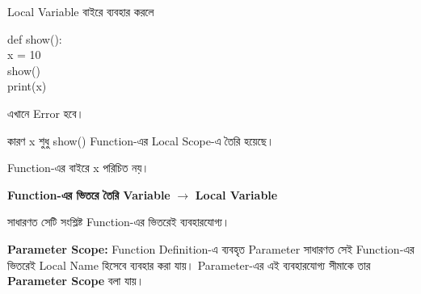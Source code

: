 \begin{codeoutputbox}{Local Variable বাইরে ব্যবহার করলে}

\noindent
\begin{minipage}[t]{0.52\linewidth}
\codeheading

\begin{english}
\ttfamily
def show():\\
\hspace*{4mm}x = 10\\[0.5mm]
show()\\
print(x)
\end{english}

\end{minipage}
\hfill
\begin{minipage}[t]{0.44\linewidth}
\outputheading

এখানে Error হবে।

কারণ
\textenglish{\ttfamily x}
শুধু
\textenglish{\ttfamily show()}
Function-এর Local Scope-এ তৈরি হয়েছে।

Function-এর বাইরে
\textenglish{\ttfamily x}
পরিচিত নয়।

\end{minipage}

\end{codeoutputbox}

\begin{rememberbox}

\begin{center}

\textbf{Function-এর ভিতরে তৈরি Variable}
\(\longrightarrow\)
\textbf{Local Variable}

\end{center}

সাধারণত সেটি সংশ্লিষ্ট Function-এর ভিতরেই ব্যবহারযোগ্য।

\end{rememberbox}



\begin{definitionbox}

\textbf{Parameter Scope:}
Function Definition-এ ব্যবহৃত Parameter সাধারণত সেই Function-এর
ভিতরেই Local Name হিসেবে ব্যবহার করা যায়। Parameter-এর এই
ব্যবহারযোগ্য সীমাকে তার \textbf{Parameter Scope} বলা যায়।

\end{definitionbox}

